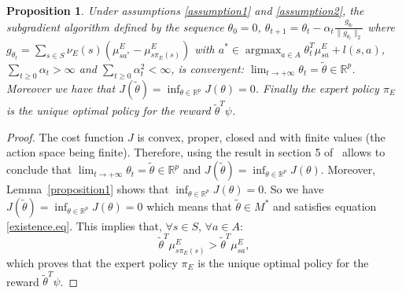 \documentclass[tablecaption=bottom]{jmlr}
\newtheorem{prop}{Proposition}
\newcommand{\argmax}{\operatorname*{argmax}} %
\begin{document}
\begin{prop}
Under assumptions \ref{assumption1} and \ref{assumption2}, the
subgradient algorithm defined by the sequence $\theta_0=0$,
$\theta_{t+1}=\theta_t-\alpha_t\frac{g_{\theta_t}}{\|g_{\theta_t}\|_2}$
where $g_{\theta_t}=\sum_{s\in
S}\nu_E(s)(\mu^E_{sa^*}-\mu^E_{s\pi_E(s)})$ with
$a^*\in\argmax_{a\in A}\theta_t^T\mu^E_{sa}+l(s,a)$,
$\sum_{t\geq0}\alpha_t>\infty$ and $\sum_{t\geq0}\alpha_t^2<\infty$,
is convergent:
$\lim_{t\rightarrow+\infty}\theta_t=\tilde{\theta}\in\mathbb{R}^p$.
Moreover we have that
$J(\tilde{\theta})=\inf_{\theta\in\mathbb{R}^p}J(\theta)=0$. Finally
the expert policy $\pi_E$ is the unique optimal policy for the
reward $\tilde{\theta}^T\psi$.
\end{prop}
\begin{proof}
The cost function  $J$ is convex, proper, closed and with finite
values (the action space being finite). Therefore, using the result in section 5 
of~\cite{correa1993convergence} allows to conclude that
$\lim_{t\rightarrow+\infty}\theta_t=\tilde{\theta}\in\mathbb{R}^p$
and $J(\tilde{\theta})=\inf_{\theta\in\mathbb{R}^p}J(\theta)$.
%
Moreover, Lemma~\ref{proposition1} shows that
$\inf_{\theta\in\mathbb{R}^p}J(\theta)=0$.
%
So we have
$J(\tilde{\theta})=\inf_{\theta\in\mathbb{R}^p}J(\theta)=0$ which
means that $\tilde{\theta}\in M^*$ and satisfies equation
\eqref{existence.eq}. This implies that, $\forall s\in S$, $\forall
a\in A$:
\begin{equation}
\tilde{\theta}^T\mu^E_{s\pi_E(s)}>\tilde{\theta}^T\mu^E_{sa},
\end{equation}
which proves that the expert policy $\pi_E$ is the unique optimal
policy for the reward $\tilde{\theta}^T\psi$.
\end{proof}
\end{document}
